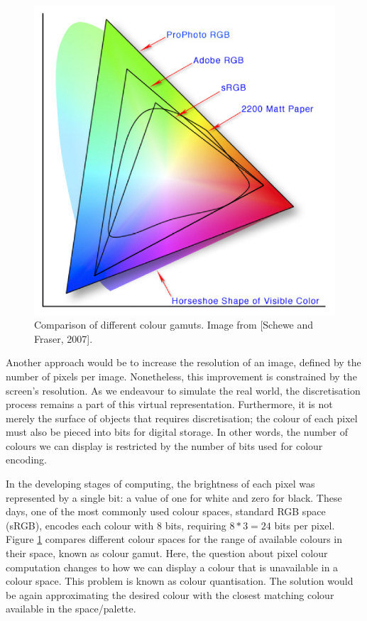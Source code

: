 \begin{figure}
\includegraphics[width=\linewidth]{Images/colourspace.png}
\caption{Comparison of different colour gamuts. Image from [Schewe and Fraser, 2007].}\label{fig:colour-gamut}
    
\end{figure} 

Another approach would be to increase the resolution of an image, defined by the number of pixels per image. Nonetheless, this improvement is constrained by the screen’s resolution. As we endeavour to simulate the real world, the discretisation process remains a part of this virtual representation. Furthermore, it is not merely the surface of objects that requires discretisation; the colour of each pixel must also be pieced into bits for digital storage. In other words, the number of colours we can display is restricted by the number of bits used for colour encoding. 

In the developing stages of computing, the brightness of each pixel was represented by a single bit: a value of one for white and zero for black. These days, one of the most commonly used colour spaces, standard RGB space (\gls{sRGB}), encodes each colour with 8 bits, requiring $8 * 3 = 24$ bits per pixel. Figure \ref{fig:colour-gamut} compares different colour spaces for the range of available colours in their space, known as colour gamut. Here, the question about pixel colour computation changes to how we can display a colour that is unavailable in a colour space. This problem is known as colour quantisation. The solution would be again approximating the desired colour with the closest matching colour available in the space/palette.


